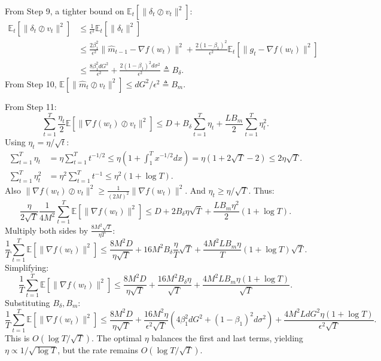 \documentclass{article}
\begin{document}
From Step 9, a tighter bound on $\mathbb{E}_t[\|\delta_t \oslash v_t\|^2]$:
\begin{align}
    \mathbb{E}_t[\|\delta_t \oslash v_t\|^2] &\le \frac{1}{\epsilon^2} \mathbb{E}_t[\|\delta_t\|^2] \\
    &\le \frac{2\beta_1^2}{\epsilon^2} \|\hat{m}_{t-1} - \nabla f(w_t)\|^2 + \frac{2(1-\beta_1)^2}{\epsilon^2} \mathbb{E}_t[\|g_t - \nabla f(w_t)\|^2] \\
    &\le \frac{8\beta_1^2 d G^2}{\epsilon^2} + \frac{2(1-\beta_1)^2 d \sigma^2}{\epsilon^2} \triangleq B_\delta.
\end{align}
From Step 10, $\mathbb{E}[\|\hat{m}_t \oslash v_t\|^2] \le d G^2 / \epsilon^2 \triangleq B_m$.

From Step 11:
\begin{equation}
    \sum_{t=1}^T \frac{\eta_t}{2} \mathbb{E}[\|\nabla f(w_t) \oslash v_t\|^2] \le D + B_\delta \sum_{t=1}^T \eta_t + \frac{L B_m}{2} \sum_{t=1}^T \eta_t^2.
\end{equation}
Using $\eta_t = \eta/\sqrt{t}$:
\begin{align}
    \sum_{t=1}^T \eta_t &= \eta \sum_{t=1}^T t^{-1/2} \le \eta (1 + \int_1^T x^{-1/2} dx) = \eta (1 + 2\sqrt{T} - 2) \le 2\eta \sqrt{T}. \\
    \sum_{t=1}^T \eta_t^2 &= \eta^2 \sum_{t=1}^T t^{-1} \le \eta^2 (1 + \log T).
\end{align}
Also $\|\nabla f(w_t) \oslash v_t\|^2 \ge \frac{1}{(2M)^2} \|\nabla f(w_t)\|^2$.
And $\eta_t \ge \eta/\sqrt{T}$.
Thus:
\begin{equation}
    \frac{\eta}{2\sqrt{T}} \frac{1}{4M^2} \sum_{t=1}^T \mathbb{E}[\|\nabla f(w_t)\|^2] \le D + 2 B_\delta \eta \sqrt{T} + \frac{L B_m \eta^2}{2} (1 + \log T).
\end{equation}
Multiply both sides by $\frac{8 M^2 \sqrt{T}}{\eta T}$:
\begin{equation}
    \frac{1}{T} \sum_{t=1}^T \mathbb{E}[\|\nabla f(w_t)\|^2] \le \frac{8 M^2 D}{\eta \sqrt{T}} + 16 M^2 B_\delta \frac{\eta}{T} \sqrt{T} + \frac{4 M^2 L B_m \eta}{T} (1 + \log T) \sqrt{T}.
\end{equation}
Simplifying:
\begin{equation}
    \frac{1}{T} \sum_{t=1}^T \mathbb{E}[\|\nabla f(w_t)\|^2] \le \frac{8 M^2 D}{\eta \sqrt{T}} + \frac{16 M^2 B_\delta \eta}{\sqrt{T}} + \frac{4 M^2 L B_m \eta (1 + \log T)}{\sqrt{T}}.
\end{equation}
Substituting $B_\delta, B_m$:
\begin{equation}
    \frac{1}{T} \sum_{t=1}^T \mathbb{E}[\|\nabla f(w_t)\|^2] \le \frac{8 M^2 D}{\eta \sqrt{T}} + \frac{16 M^2 \eta}{\epsilon^2 \sqrt{T}} \left( 4\beta_1^2 d G^2 + (1-\beta_1)^2 d \sigma^2 \right) + \frac{4 M^2 L d G^2 \eta (1 + \log T)}{\epsilon^2 \sqrt{T}}.
\end{equation}
This is $O(\log T / \sqrt{T})$. The optimal $\eta$ balances the first and last terms, yielding $\eta \propto 1/\sqrt{\log T}$, but the rate remains $O(\log T / \sqrt{T})$.
\end{document}
